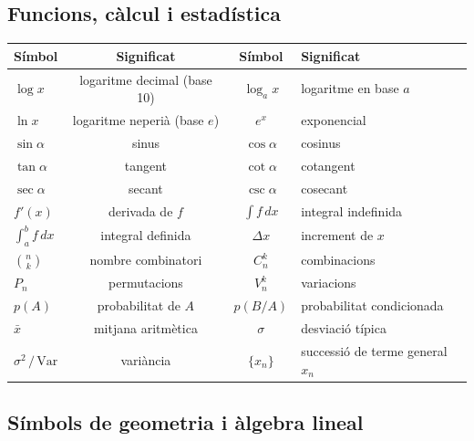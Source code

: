 \subsection*{Funcions, càlcul i estadística}

\begin{table}[H]
\centering
\renewcommand{\arraystretch}{1.25}
\begin{tabularx}{\textwidth}{lcc>{\raggedright\arraybackslash}X}
\toprule
Símbol & Significat & Símbol & Significat \\
\midrule
$\log x$ & logaritme decimal (base 10) & $\log_a x$ & logaritme en base $a$ \\
$\ln x$ & logaritme neperià (base $e$) & $e^x$ & exponencial \\
$\sin\alpha$ & sinus & $\cos\alpha$ & cosinus \\
$\tan\alpha$ & tangent & $\cot\alpha$ & cotangent \\
$\sec\alpha$ & secant & $\csc\alpha$ & cosecant \\
$f'(x)$ & derivada de $f$ & $\int f\,dx$ & integral indefinida \\
$\int_a^b f\,dx$ & integral definida & $\Delta x$ & increment de $x$ \\
$\binom{n}{k}$ & nombre combinatori & $C_n^k$ & combinacions \\
$P_n$ & permutacions & $V_n^k$ & variacions \\
$p(A)$ & probabilitat de $A$ & $p(B/A)$ & probabilitat condicionada \\
$\bar{x}$ & mitjana aritmètica & $\sigma$ & desviació típica \\
$\sigma^2\,/\,\mathrm{Var}$ & variància & $\{x_n\}$ & successió de terme general $x_n$ \\
\bottomrule
\end{tabularx}
\end{table}

\subsection*{Símbols de geometria i àlgebra lineal}

